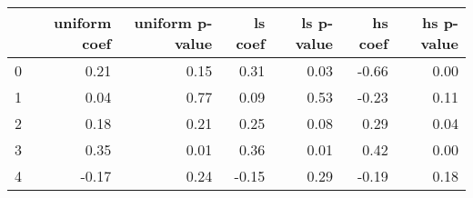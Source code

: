 \begin{tabular}{lrrrrrr}
\toprule
 & uniform coef & uniform p-value & ls coef & ls p-value & hs coef & hs p-value \\
\midrule
0 & 0.21 & 0.15 & 0.31 & 0.03 & -0.66 & 0.00 \\
1 & 0.04 & 0.77 & 0.09 & 0.53 & -0.23 & 0.11 \\
2 & 0.18 & 0.21 & 0.25 & 0.08 & 0.29 & 0.04 \\
3 & 0.35 & 0.01 & 0.36 & 0.01 & 0.42 & 0.00 \\
4 & -0.17 & 0.24 & -0.15 & 0.29 & -0.19 & 0.18 \\
\bottomrule
\end{tabular}
